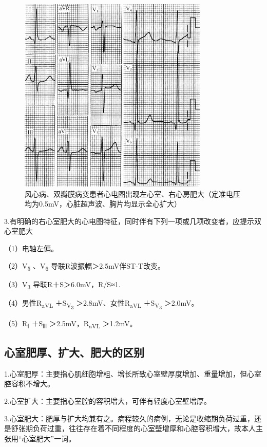 \begin{figure}[!htbp]
 \centering
 \includegraphics[width=3.55208in,height=3.69792in]{./images/Image00055.jpg}
 \captionsetup{justification=centering}
 \caption{风心病、双瓣膜病变患者心电图出现左心室、右心房肥大（定准电压均为0.5mV，心脏超声波、胸片均显示全心扩大）}
 \label{fig3-6}
  \end{figure} 

3.有明确的右心室肥大的心电图特征，同时伴有下列一项或几项改变者，应提示双心室肥大

（1）电轴左偏。

（2）V\textsubscript{5} 、V\textsubscript{6}
导联R波振幅＞2.5mV伴ST-T改变。

（3）V\textsubscript{3} 导联R＋S＞6.0mV，R/S≈1.

（4）男性R\textsubscript{aVL} ＋S\textsubscript{V\textsubscript{3}}
＞2.8mV、女性R\textsubscript{aVL} ＋S\textsubscript{V\textsubscript{3}}
＞2.0mV。

（5）R\textsubscript{Ⅰ} ＋S\textsubscript{Ⅲ}
＞2.5mV，R\textsubscript{aVL} ＞1.2mV。

\protect\hypertarget{text00009.htmlux5cux23subid44}{}{}

\subsection{心室肥厚、扩大、肥大的区别}

1.心室肥厚：主要指心肌细胞增粗、增长所致心室壁厚度增加、重量增加，但心室腔容积不增大。

2.心室扩大：主要指心室腔的容积增大，可伴有轻度心室壁增厚。

3.心室肥大：肥厚与扩大均兼有之。病程较久的病例，无论是收缩期负荷过重，还是舒张期负荷过重，往往存在着不同程度的心室壁增厚和心腔容积增大，故本人主张用“心室肥大”一词。

